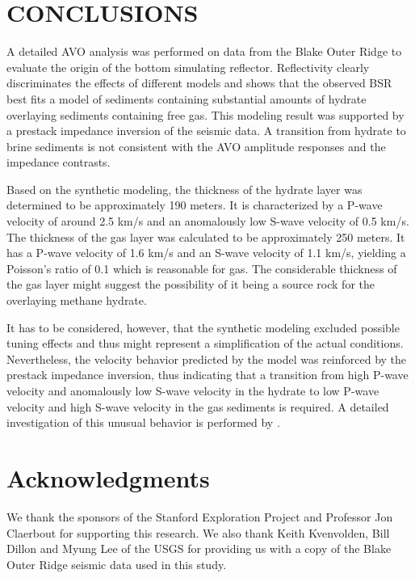 \notinteractive
{}
 

\section{CONCLUSIONS}

A detailed AVO analysis was performed on data from the Blake Outer Ridge to
evaluate the origin of the bottom simulating reflector. Reflectivity clearly
discriminates the effects of different models and shows that the observed 
BSR best fits a model of sediments containing substantial amounts of hydrate 
overlaying sediments containing free gas. This modeling result was supported 
by a prestack impedance inversion of the seismic data. A transition from 
hydrate to brine sediments is not consistent with the AVO amplitude responses
and the impedance contrasts. 
\par
Based on the synthetic modeling, the thickness of the hydrate layer was 
determined to be approximately 190 meters. It is characterized by a P-wave
velocity of around 2.5 km/s and an anomalously low S-wave velocity of 0.5 km/s.
The thickness of the gas layer was calculated to be approximately 250 meters.
It has a P-wave velocity of 1.6 km/s and an S-wave velocity of 1.1 km/s, 
yielding a Poisson's ratio of 0.1 which is reasonable for gas. The considerable
thickness of the gas layer might suggest the possibility of it being a source 
rock for the overlaying methane hydrate. 
\par
It has to be considered, however, that 
the synthetic modeling excluded possible tuning effects and thus might 
represent a simplification of the actual conditions. Nevertheless, the 
velocity behavior predicted by the model was reinforced by the prestack
impedance inversion, thus
indicating that a transition from high P-wave velocity and
anomalously low S-wave velocity in the hydrate to low P-wave velocity and high
S-wave velocity in the gas sediments is required. A detailed investigation of this 
unusual behavior is performed by \cite{Ecker.sep.80.christine2}.



\section{Acknowledgments}

We thank the sponsors of the Stanford Exploration Project and Professor Jon
Claerbout for supporting this research. We also thank Keith Kvenvolden, Bill
Dillon and Myung Lee of the USGS for providing us with a copy of the Blake
Outer Ridge seismic data used in this study.










